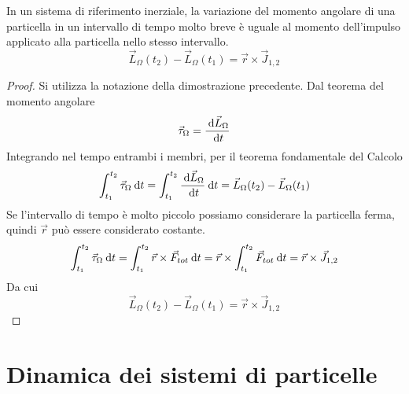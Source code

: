 \documentclass{article}
\theoremstyle{plain}
\begin{document}
\begin{shadedTheorem}
    In un sistema di riferimento inerziale, la variazione del momento angolare di una particella in un intervallo di tempo molto breve è uguale al momento dell'impulso applicato alla particella nello stesso intervallo.
    \[\vec L_{\Omega}(t_2) -\vec L_{\Omega}(t_1) = \vec r \times \vec J_{1,2}\]
\end{shadedTheorem}
\begin{proof}
    Si utilizza la notazione della dimostrazione precedente. Dal teorema del momento angolare 
    \[\vec \tau_\Omega =\frac{\:\text{d} \vec L_{\Omega}}{\:\text{d} t}\]
    Integrando nel tempo entrambi i membri, per il teorema fondamentale del Calcolo
    \[\int_{t_1}^{t_2}\vec \tau_\Omega \:\text{d} t= \int_{t_1}^{t_2}\frac{\:\text{d} \vec L_{\Omega}}{\:\text{d} t}\:\text{d} t = \vec L_{\Omega}(t_2) -\vec L_{\Omega}(t_1)\]
    Se l'intervallo di tempo è molto piccolo possiamo considerare la particella ferma, quindi $\vec r$ può essere considerato costante.
    \[\int_{t_1}^{t_2}\vec \tau_\Omega \:\text{d} t = \int_{t_1}^{t_2}\vec r \times \vec F_{tot} \:\text{d} t = \vec r \times\int_{t_1}^{t_2} \vec F_{tot} \:\text{d} t = \vec r \times \vec J_{1,2}\]
    Da cui
    \[\vec L_{\Omega}(t_2) -\vec L_{\Omega}(t_1) = \vec r \times \vec J_{1,2}\]
\end{proof}
\section{Dinamica dei sistemi di particelle}
\end{document}
